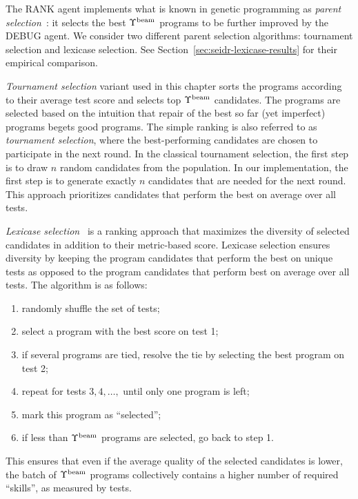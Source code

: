 The RANK agent implements what is known in genetic programming as \emph{parent selection}~\cite{koza1994:genetic}: it selects the best $\Upsilon^\text{beam}{}$ programs to be further improved by the DEBUG agent.
We consider two different parent selection algorithms: tournament selection and lexicase selection. 
See Section~\ref{sec:seidr-lexicase-results} for their empirical comparison.

\emph{Tournament selection} variant used in this chapter sorts the programs according to their average test score and selects top $\Upsilon^\text{beam}{}$ candidates. 
The programs are selected based on the intuition that repair of the best so far (yet imperfect) programs begets good programs. 
The simple ranking is also referred to as \emph{tournament selection}, where the best-performing candidates are chosen to participate in the next round.  
In the classical tournament selection, the first step is to draw $n$ random candidates from the population. 
In our implementation, the first step is to generate exactly $n$ candidates that are needed for the next round. 
This approach prioritizes candidates that perform the best on average over all tests.

\emph{Lexicase selection}~\cite{helmuth2015:solving} is a ranking approach that maximizes the diversity of selected candidates in addition to their metric-based score.
Lexicase selection ensures diversity by keeping the program candidates that perform the best on unique tests as opposed to the program candidates that perform best on average over all tests.
The algorithm is as follows:
\begin{enumerate}

\setlength{\parskip}{0pt}
\setlength\itemsep{0pt}

    \item randomly shuffle the set of tests;
    \item select a program with the best score on test 1;
    \item if several programs are tied, resolve the tie by selecting the best program on test 2;
    \item repeat for tests $3,4,\dots,$ until only one program is left;
    \item mark this program as ``selected'';
    \item if less than $\Upsilon^\text{beam}$ programs are selected, go back to step 1.
\end{enumerate}
This ensures that even if the average quality of the selected candidates is lower, the batch of $\Upsilon^\text{beam}{}$ programs collectively contains a higher number of required ``skills'', as measured by tests.



